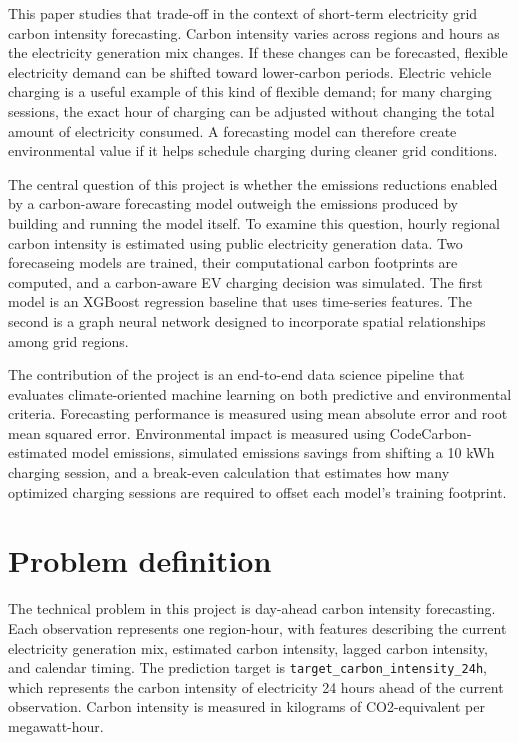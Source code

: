 \documentclass{article}
\begin{document}
This paper studies that trade-off in the context of short-term electricity grid carbon intensity forecasting. Carbon intensity varies across regions and hours as the electricity generation mix changes. If these changes can be forecasted, flexible electricity demand can be shifted toward lower-carbon periods. Electric vehicle charging is a useful example of this kind of flexible demand; for many charging sessions, the exact hour of charging can be adjusted without changing the total amount of electricity consumed. A forecasting model can therefore create environmental value if it helps schedule charging during cleaner grid conditions.

The central question of this project is whether the emissions reductions enabled by a carbon-aware forecasting model outweigh the emissions produced by building and running the model itself. To examine this question, hourly regional carbon intensity is estimated using public electricity generation data. Two forecaseing models are trained, their computational carbon footprints are computed, and a carbon-aware EV charging decision was simulated. The first model is an XGBoost regression baseline that uses time-series features. The second is a graph neural network designed to incorporate spatial relationships among grid regions.

The contribution of the project is an end-to-end data science pipeline that evaluates climate-oriented machine learning on both predictive and environmental criteria. Forecasting performance is measured using mean absolute error and root mean squared error. Environmental impact is measured using CodeCarbon-estimated model emissions, simulated emissions savings from shifting a 10 kWh charging session, and a break-even calculation that estimates how many optimized charging sessions are required to offset each model's training footprint. 

\section{Problem definition}

The technical problem in this project is day-ahead carbon intensity forecasting. Each observation represents one region-hour, with features describing the current electricity generation mix, estimated carbon intensity, lagged carbon intensity, and calendar timing. The prediction target is \texttt{target\_carbon\_intensity\_24h}, which represents the carbon intensity of electricity 24 hours ahead of the current observation. Carbon intensity is measured in kilograms of CO2-equivalent per megawatt-hour.
\end{document}
